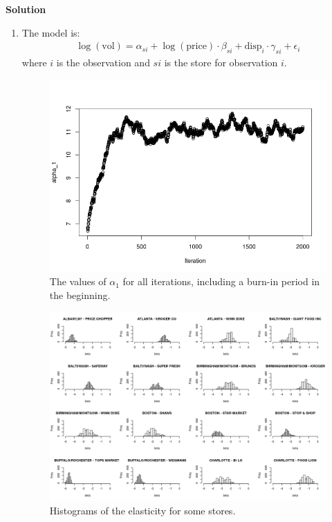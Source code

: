 \documentclass{article}
\begin{document}
\textbf{Solution}
\begin{enumerate}
\item The model is:
\begin{align*}
\log (\mbox{vol}) = \alpha_{si} + \log (\mbox{price}) \cdot \beta_{si} + \mbox{disp}_i  \cdot \gamma_{si} + \epsilon_i 
\end{align*}
where \(i\) is the observation and \(si\) is the store for observation \(i\).

\begin{figure}[h]
\includegraphics[width=\textwidth]{alpha1.jpeg}
\caption{The values of \(\alpha_1\) for all iterations, including a burn-in period in the beginning.}
\end{figure}


\begin{figure}[h]
\includegraphics[width=\textwidth]{beta.jpeg}
\caption{Histograms of the elasticity for some stores.}
\end{figure}



\end{enumerate}
\end{document}
